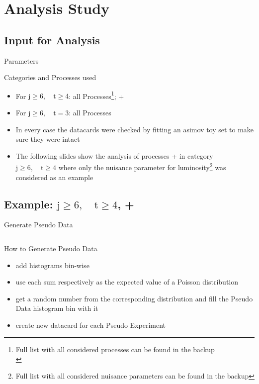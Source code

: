 \section{\ttbarH Analysis Study}
\subsection{Input for Analysis}
\begin{frame}{Parameters}
\begin{block}{Categories and Processes used}
\begin{itemize}
\item For $\text{j}\geq 6,\quad \text{t}\geq 4$: all Processes\footnote{Full list with all considered processes can be found in the backup\\}; \ttbarH \bbbar + \ttbar\bbbar\\
\item For $\text{j}\geq 6,\quad \text{t} = 3$: all Processes
\end{itemize}
\end{block}

\begin{itemize}
\item In every case the datacards were checked by fitting an asimov toy set to make sure they were intact
\item The following slides show the analysis of processes \ttbarH \bbbar + \ttbar\bbbar in category $\text{j}\geq 6,\quad \text{t}\geq 4$ where only the nuisance parameter for luminosity\footnote{Full list with all considered nuisance parameters can be found in the backup} was considered as an example
\end{itemize}

\end{frame}
\subsection{Example: $\text{j}\geq 6,\quad \text{t}\geq 4$, \ttbarH \bbbar + \ttbar\bbbar}

\begin{frame}{Generate Pseudo Data}
\begin{figure}
\centering
{}$\qquad$

\end{figure}
\vskip -0.3cm
\begin{block}{How to Generate Pseudo Data}
\begin{itemize}
\item add histograms bin-wise
\item use each sum respectively as the expected value of a Poisson distribution
\item get a random number from the corresponding distribution and fill the Pseudo Data histogram bin with it
\item create new datacard for each Pseudo Experiment
\end{itemize}
\end{block}
\end{frame}

